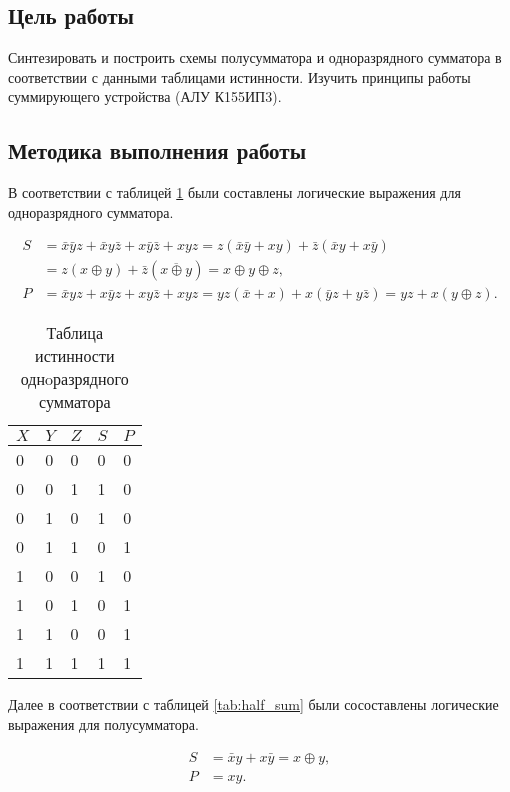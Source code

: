 \subsection*{Цель работы}

Синтезировать и построить схемы полусумматора и одноразрядного сумматора в соответствии с данными таблицами истинности. Изучить принципы работы суммирующего устройства (АЛУ К155ИП3).

\subsection*{Методика выполнения работы}

В соответствии с таблицей \ref{tab:one_sum} были составлены логические выражения для одноразрядного сумматора.

\[
\begin{aligned}
S &= \bar{x}\bar{y}z + \bar{x}y\bar{z} + x\bar{y}\bar{z} + xyz
   = z(\bar{x}\bar{y} + xy) + \bar{z}(\bar{x}y + x\bar{y}) \\
   &= z(x \oplus y) + \bar{z}(\overline{x \oplus y})
   = x \oplus y \oplus z, \\[6pt]
P &= \bar{x}yz + x\bar{y}z + xy\bar{z} + xyz
   = yz(\bar{x} + x) + x(\bar{y}z + y\bar{z})
   = yz + x(y \oplus z).
\end{aligned}
\]

\begin{table}[h!]
\centering
\caption{Таблица истинности однoразрядного сумматора}
\begin{tabularx}{\textwidth}{|X|X|X|X|X|}
\hline
$X$ & $Y$ & $Z$ & $S$ & $P$ \\ \hline
0 & 0 & 0 & 0 & 0 \\ \hline
0 & 0 & 1 & 1 & 0 \\ \hline
0 & 1 & 0 & 1 & 0 \\ \hline
0 & 1 & 1 & 0 & 1 \\ \hline
1 & 0 & 0 & 1 & 0 \\ \hline
1 & 0 & 1 & 0 & 1 \\ \hline
1 & 1 & 0 & 0 & 1 \\ \hline
1 & 1 & 1 & 1 & 1 \\ \hline
\end{tabularx}
\label{tab:one_sum}
\end{table}

Далее в соответствии с таблицей \ref{tab:half_sum} были сосоставлены логические выражения для полусумматора.

\[
\begin{aligned}
S &= \bar{x}y + x\bar{y} = x \oplus y, \\[4pt]
P &= xy.
\end{aligned}
\]

